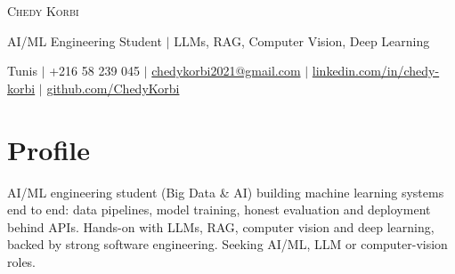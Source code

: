 \documentclass[a4paper,11pt]{article}
\begin{document}
\begin{center}
  {\Huge\scshape Chedy Korbi}\par\vspace{5pt}
  AI/ML Engineering Student $|$ LLMs, RAG, Computer Vision, Deep Learning\par\vspace{2pt}
  \small Tunis $|$ +216 58 239 045 $|$
  \href{mailto:chedykorbi2021@gmail.com}{chedykorbi2021@gmail.com} $|$
  \href{https://www.linkedin.com/in/chedy-korbi-2463a9250/}{linkedin.com/in/chedy-korbi} $|$
  \href{https://github.com/ChedyKorbi}{github.com/ChedyKorbi}
\end{center}

\section{Profile}
\small AI/ML engineering student (Big Data \& AI) building machine learning systems end to end: data pipelines, model training,
honest evaluation and deployment behind APIs. Hands-on with LLMs, RAG, computer vision and deep learning, backed by strong
software engineering. Seeking AI/ML, LLM or computer-vision roles.\normalsize
\end{document}
